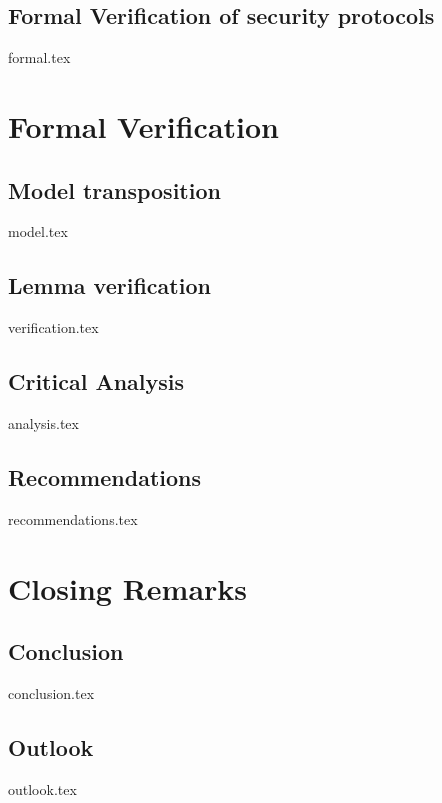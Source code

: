 \documentclass[a4paper,12pt,twoside]{report}
\begin{document}
\section{Formal Verification of security protocols}
\label{sec:formal}
{formal.tex}

\clearpage

\chapter{Formal Verification}
\label{chap:formal}

\section{Model transposition}
\label{sec:model}
{model.tex}

\section{Lemma verification}
\label{sec:verification}
{verification.tex}

\section{Critical Analysis}
\label{sec:analysis}
{analysis.tex}

\section{Recommendations}
\label{sec:recommendations}
{recommendations.tex}

\clearpage

\chapter{Closing Remarks}
\label{chap:intro}

\section{Conclusion}
\label{sec:problem}
{conclusion.tex}

\section{Outlook}
\label{sec:outlook}
{outlook.tex}

\clearpage

\printbibliography[title={Literature},heading=bibintoc,nottype=online]

\printbibliography[title={Online Sources},heading=bibintoc,type=online]

\clearpage

\appendices
\end{document}
